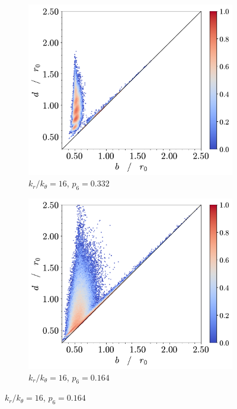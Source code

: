 \begin{figure}[tbp]
        \begin{subfigure}[b]{0.40\textwidth}
         \centering
         \includegraphics[width=\textwidth]{./figures/ph/t_k16_231_bs_pd.pdf}
         \caption{$k_r/k_\theta=16$, $p_6=0.332$}%
         \label{fig:bspdc}
     \end{subfigure}
     \hspace{1cm}
      \begin{subfigure}[b]{0.40\textwidth}
         \centering
         \includegraphics[width=\textwidth]{./figures/ph/t_k16_0_bs_pd.pdf}
         \caption{$k_r/k_\theta=16$, $p_6=0.164$}%
         \label{fig:bspdd}
     \end{subfigure}



\end{figure}
